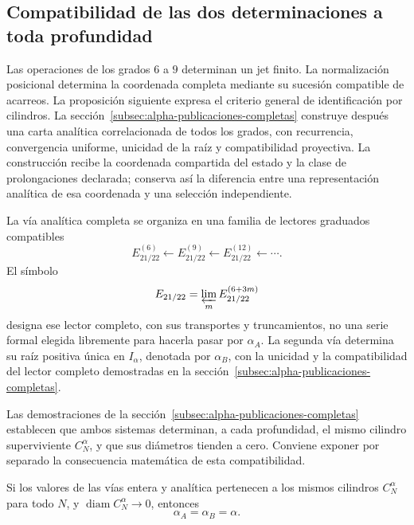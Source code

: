 \subsection{Compatibilidad de las dos determinaciones a toda profundidad}
\label{subsec:alpha-limite-dos-vias}

\begin{remark}
Las operaciones de los grados \(6\) a \(9\) determinan un jet finito.
La normalización posicional determina la coordenada completa mediante
su sucesión compatible de acarreos. La proposición siguiente expresa
el criterio general de identificación por cilindros. La
sección~\ref{subsec:alpha-publicaciones-completas} construye después
una carta analítica correlacionada de todos los grados, con recurrencia,
convergencia uniforme, unicidad de la raíz y compatibilidad proyectiva.
La construcción recibe la coordenada compartida del estado y la clase
de prolongaciones declarada; conserva así la diferencia entre una
representación analítica de esa coordenada y una selección independiente.
\end{remark}

La vía analítica completa se organiza en una familia de lectores
graduados compatibles
\[
 E_{21/22}^{(6)}\longleftarrow E_{21/22}^{(9)}
 \longleftarrow E_{21/22}^{(12)}\longleftarrow\cdots.
\]
El símbolo
\[
 E_{21/22}=\varprojlim_m E_{21/22}^{(6+3m)}
\]
designa ese lector completo, con sus transportes y truncamientos, no una
serie formal elegida libremente para hacerla pasar por \(\alpha_A\).
La segunda vía determina su raíz positiva única en \(I_\alpha\),
denotada por \(\alpha_B\), con la unicidad y la compatibilidad del
lector completo demostradas en la sección~\ref{subsec:alpha-publicaciones-completas}.

Las demostraciones de la sección~\ref{subsec:alpha-publicaciones-completas}
establecen que ambos sistemas determinan, a cada profundidad, el mismo
cilindro superviviente \(C_N^\alpha\), y que sus diámetros tienden a
cero. Conviene exponer por separado la consecuencia matemática de esta
compatibilidad.

\begin{proposition}
\label{prop:alpha-dos-limites}
Si los valores de las vías entera y analítica pertenecen a los
mismos cilindros \(C_N^\alpha\) para todo \(N\), y
\(\operatorname{diam}C_N^\alpha\to0\), entonces
\[
 \alpha_A=\alpha_B=\alpha.
\]
\end{proposition}

